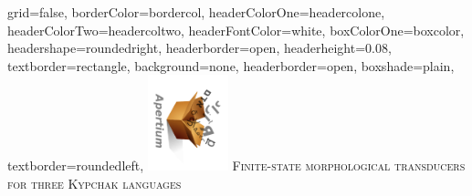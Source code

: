 \documentclass[a0paper,fontscale=0.3]{baposter}  %
\begin{document}
	\setlength{\pdfpageheight}{\paperheight}
	\setlength{\pdfpagewidth}{\paperwidth}

	\background{{
	}}



	\begin{poster}{
			grid=false,
			borderColor=bordercol,
			headerColorOne=headercolone,
			headerColorTwo=headercoltwo,
			headerFontColor=white,
			boxColorOne=boxcolor,
			headershape=roundedright,
  headerborder=open,
  headerheight=0.08\textheight,
			textborder=rectangle,
			background=none,
			headerborder=open,
			boxshade=plain,
			textborder=roundedleft,
		}{
			\hspace{-2em}\includegraphics[angle=90,height=7.5em]{apertium5a}
		}{
			{\vspace{0pt}\hspace{-2.2ex}
			{\titlefont \textsc{Finite-state morphological transducers\\for three Kypchak languages}}}
		}{

}
\end{poster}
\end{document}
